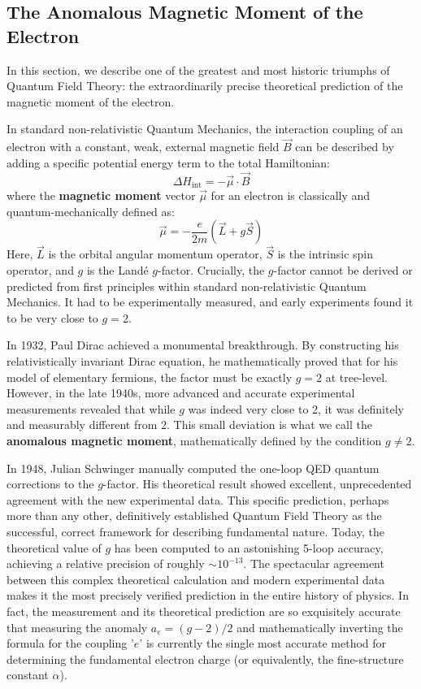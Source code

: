 \subsection{The Anomalous Magnetic Moment of the Electron}

In this section, we describe one of the greatest and most historic triumphs of Quantum Field Theory: the extraordinarily precise theoretical prediction of the magnetic moment of the electron.

In standard non-relativistic Quantum Mechanics, the interaction coupling of an electron with a constant, weak, external magnetic field $\vec{B}$ can be described by adding a specific potential energy term to the total Hamiltonian:
\[
    \Delta H_{\text{int}} = -\vec{\mu} \cdot \vec{B}
\]
where the \textbf{magnetic moment} vector $\vec{\mu}$ for an electron is classically and quantum-mechanically defined as:
\[
    \vec{\mu} = -\frac{e}{2m} (\vec{L} + g \vec{S})
\]
Here, $\vec{L}$ is the orbital angular momentum operator, $\vec{S}$ is the intrinsic spin operator, and $g$ is the Landé $g$-factor.
Crucially, the $g$-factor cannot be derived or predicted from first principles within standard non-relativistic Quantum Mechanics. It had to be experimentally measured, and early experiments found it to be very close to $g = 2$.

In 1932, Paul Dirac achieved a monumental breakthrough. By constructing his relativistically invariant Dirac equation, he mathematically proved that for his model of elementary fermions, the factor must be exactly $g=2$ at tree-level.
However, in the late 1940s, more advanced and accurate experimental measurements revealed that while $g$ was indeed very close to 2, it was definitely and measurably different from 2. This small deviation is what we call the \textbf{anomalous magnetic moment}, mathematically defined by the condition $g \neq 2$.

In 1948, Julian Schwinger manually computed the one-loop QED quantum corrections to the $g$-factor. His theoretical result showed excellent, unprecedented agreement with the new experimental data. This specific prediction, perhaps more than any other, definitively established Quantum Field Theory as the successful, correct framework for describing fundamental nature.
Today, the theoretical value of $g$ has been computed to an astonishing 5-loop accuracy, achieving a relative precision of roughly $\sim 10^{-13}$. The spectacular agreement between this complex theoretical calculation and modern experimental data makes it the most precisely verified prediction in the entire history of physics. In fact, the measurement and its theoretical prediction are so exquisitely accurate that measuring the anomaly $a_e = (g-2)/2$ and mathematically inverting the formula for the coupling '$e$' is currently the single most accurate method for determining the fundamental electron charge (or equivalently, the fine-structure constant $\alpha$).

